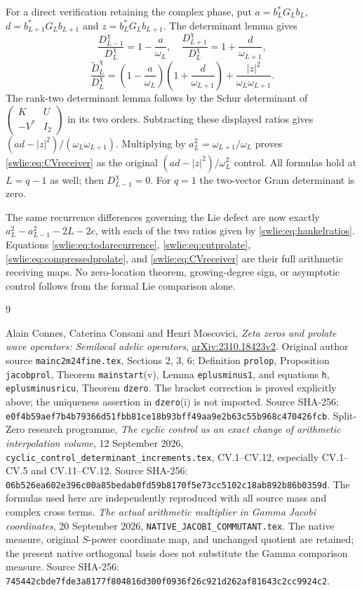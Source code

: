 For a direct verification retaining the complex phase,
put $a=b_L^*G_Lb_L$, $d=b_{L+1}^*G_Lb_{L+1}$ and
$z=b_L^*G_Lb_{L+1}$. The determinant lemma gives
\[
 \frac{D_{L-1}^\chi}{D_L^\chi}=1-\frac a{\omega_L},
 \quad
 \frac{D_{L+1}^\chi}{D_L^\chi}=1+\frac d{\omega_{L+1}},
\]
\[
 \frac{\widetilde D_L^\chi}{D_L^\chi}
 =\left(1-\frac a{\omega_L}\right)
  \left(1+\frac d{\omega_{L+1}}\right)
                +\frac{|z|^2}{\omega_L\omega_{L+1}}.
\]
The rank-two determinant lemma follows by the
Schur determinant of
$\left(\begin{smallmatrix}K&U\\-V^*&I_2\end{smallmatrix}\right)$
in its two orders. Subtracting these displayed ratios
gives $(ad-|z|^2)/(\omega_L\omega_{L+1})$.
Multiplying by $a_L^2=\omega_{L+1}/\omega_L$
proves \eqref{swlie:eq:CVreceiver} as the original
$(ad-|z|^2)/\omega_L^2$ control. All formulas hold
at $L=q-1$ as well; then $D_{L-1}^\chi=0$.
For $q=1$ the two-vector Gram determinant is zero.

The same recurrence differences governing the Lie
defect are now exactly
$a_L^2-a_{L-1}^2-2L-2c$, with each of the two
ratios given by \eqref{swlie:eq:hankelratios}. Equations
\eqref{swlie:eq:todarecurrence}, \eqref{swlie:eq:cutprolate},
\eqref{swlie:eq:compressedprolate}, and \eqref{swlie:eq:CVreceiver}
are their full arithmetic receiving maps.
No zero-location theorem, growing-degree sign, or
asymptotic control follows from the formal Lie
comparison alone.

\begin{thebibliography}{9}\raggedright
{} Alain Connes, Caterina Consani and Henri Moscovici,
\emph{Zeta zeros and prolate wave operators: Semilocal adelic operators},
\href{https://arxiv.org/abs/2310.18423v2}{arXiv:2310.18423v2}.
Original author source \texttt{mainc2m24fine.tex}, Sections 2, 3, 6;
Definition \texttt{prolop}, Proposition \texttt{jacobprol},
Theorem \texttt{mainstart}(v), Lemma \texttt{eplusminus1},
and equations \texttt{h}, \texttt{eplusminusricu}, Theorem
\texttt{dzero}. The bracket correction is proved explicitly
above; the uniqueness assertion in \texttt{dzero}(i) is not
imported. Source SHA-256:
\texttt{e0f4b59aef7b4b79366d51fbb81ce18b93bff49aa9e2b63c55b968c470426fcb}.
 Split-Zero research programme,
\emph{The cyclic control as an exact change of arithmetic
interpolation volume}, 12 September 2026,
\texttt{cyclic\_control\_determinant\_increments.tex},
CV.1--CV.12, especially CV.1--CV.5 and CV.11--CV.12.
Source SHA-256:
\texttt{06b526ea602e396c00a85bedab0fd59b8170f5e73cc5102c18ab892b86b0359d}.
The formulas used here are independently reproduced
with all source mass and complex cross terms.
 \emph{The actual arithmetic multiplier in
Gamma Jacobi coordinates}, 20 September 2026,
\texttt{NATIVE\_JACOBI\_COMMUTANT.tex}. The native measure,
original $S$-power coordinate map, and unchanged quotient
are retained; the present native orthogonal basis does
not substitute the Gamma comparison measure.
Source SHA-256:
\texttt{745442cbde7fde3a8177f804816d300f0936f26c921d262af81643c2cc9924c2}.
\end{thebibliography}

